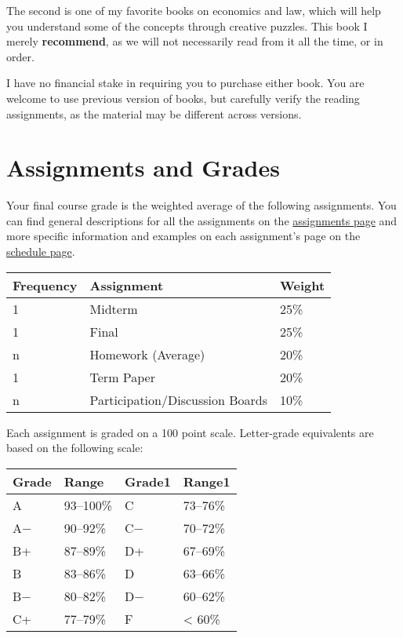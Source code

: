 \documentclass{article}
\begin{document}
The second is one of my favorite books on economics and law, which will
help you understand some of the concepts through creative puzzles. This
book I merely \textbf{recommend}, as we will not necessarily read from
it all the time, or in order.

I have no financial stake in requiring you to purchase either book. You
are welcome to use previous version of books, but carefully verify the
reading assignments, as the material may be different across versions.

\hypertarget{assignments-and-grades}{%
\section*{Assignments and Grades}\label{assignments-and-grades}}

Your final course grade is the weighted average of the following
assignments. You can find general descriptions for all the assignments
on the
\href{http://lawS21.classes.ryansafner.com/assignments/}{assignments
page} and more specific information and examples on each assignment's
page on the
\href{http://lawS21.classes.ryansafner.com/schedule/}{schedule page}.

\begin{center}

\begin{tabular}{lll}
\toprule
Frequency & Assignment & Weight\\
\midrule
1 & Midterm & 25\%\\
1 & Final & 25\%\\
n & Homework (Average) & 20\%\\
1 & Term Paper & 20\%\\
n & Participation/Discussion Boards & 10\%\\
\bottomrule
\end{tabular}
\end{center}

Each assignment is graded on a 100 point scale. Letter-grade equivalents
are based on the following scale:

\begin{center}

\begin{tabular}{llll}
\toprule
Grade & Range & Grade1 & Range1\\
\midrule
A & 93–100\% & C & 73–76\%\\
A− & 90–92\% & C− & 70–72\%\\
B+ & 87–89\% & D+ & 67–69\%\\
B & 83–86\% & D & 63–66\%\\
B− & 80–82\% & D− & 60–62\%\\
\addlinespace
C+ & 77–79\% & F & < 60\%\\
\bottomrule
\end{tabular}
\end{center}
\end{document}
